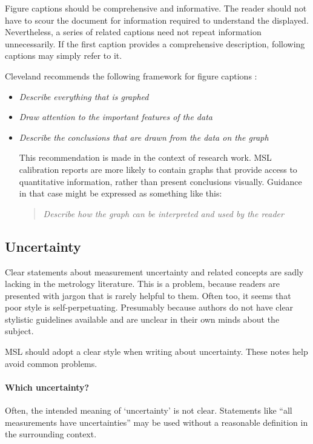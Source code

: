 Figure captions should be comprehensive and informative. The reader should not have to scour the document for information required to understand the displayed. Nevertheless, a series of related captions need not repeat information unnecessarily. If the first caption provides a comprehensive description, following captions may simply refer to it.

Cleveland recommends the following framework for figure captions \cite{Cleveland}:
\begin{itemize}
\item	\textit{Describe everything that is graphed}
\item	\textit{Draw attention to the important features of the data}
\item	\textit{Describe the conclusions that are drawn from the data on the graph}

This recommendation is made in the context of research work. MSL calibration reports are more likely to contain graphs that provide access to quantitative information, rather than present conclusions visually. Guidance in that case might be expressed as something like this:
\begin{quote}
\textit{Describe how the graph can be interpreted and used by the reader}
\end{quote}

\end{itemize}

\subsection{Uncertainty}
Clear statements about measurement uncertainty and related concepts are sadly lacking in the metrology literature. This is a problem, because readers are presented with jargon that is rarely helpful to them. Often too, it seems that poor style is self-perpetuating. Presumably because authors do not have clear stylistic guidelines available and are unclear in their own minds about the subject. 

MSL should adopt a clear style when writing about uncertainty. These notes help avoid common problems.

\paragraph{Which uncertainty?}
Often, the intended meaning of `uncertainty' is not clear. Statements like ``all measurements have uncertainties'' may be used without a reasonable definition in the surrounding context.

